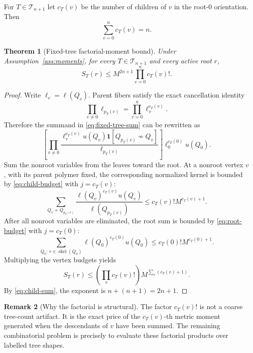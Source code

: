 \documentclass[11pt,a4paper]{article}
\newtheorem{theorem}{Theorem}[section]
\theoremstyle{definition}
\newtheorem{remark}[theorem]{Remark}
\newcommand{\skel}{\operatorname{skel}}
\newcommand{\Tree}{\mathcal T}
\newcommand{\ind}{\mathbf 1}
\begin{document}
For $T\in\Tree_{n+1}$ let $c_T(v)$ be the number of children of $v$ in the root-$0$
orientation.  Then
\begin{equation}
  \sum_{v=0}^{n}c_T(v)=n.
  \label{eq:child-sum}
\end{equation}

\begin{theorem}[Fixed-tree factorial-moment bound]
\label{thm:fixed-tree}
Under Assumption~\ref{ass:moments}, for every $T\in\Tree_{n+1}$ and every active root
$r$,
\begin{equation}
  S_T(r)\le M^{2n+1}\prod_{v=0}^{n}c_T(v)!.
  \label{eq:fixed-tree-bound}
\end{equation}
\end{theorem}

\begin{proof}
Write $\ell_v=\ell(Q_v)$.  Parent fibers satisfy the exact cancellation identity
\begin{equation}
 \prod_{v\ne0}\ell_{p_T(v)}
 =\prod_{v=0}^{n}\ell_v^{c_T(v)}.
 \label{eq:metric-cancellation}
\end{equation}
Therefore the summand in \eqref{eq:fixed-tree-sum} can be rewritten as
\begin{equation}
 \left[
  \prod_{v\ne0}
   \frac{\ell_v^{c_T(v)}u(Q_v)
         \ind[Q_{p_T(v)}\not\sim Q_v]}
        {\ell_{p_T(v)}}
 \right]
 \ell_0^{c_T(0)}u(Q_0).
 \label{eq:normalized-product}
\end{equation}
Sum the nonroot variables from the leaves toward the root.  At a nonroot vertex $v$,
with its parent polymer fixed, the corresponding normalized kernel is bounded by
\eqref{eq:child-budget} with $j=c_T(v)$:
\[
  \sum_{Q_v\not\sim Q_{p_T(v)}}
    \frac{\ell(Q_v)^{c_T(v)}u(Q_v)}{\ell(Q_{p_T(v)})}
  \le c_T(v)!M^{c_T(v)+1}.
\]
After all nonroot variables are eliminated, the root sum is bounded by
\eqref{eq:root-budget} with $j=c_T(0)$:
\[
  \sum_{Q_0:\,r\in\skel(Q_0)}
     \ell(Q_0)^{c_T(0)}u(Q_0)
  \le c_T(0)!M^{c_T(0)+1}.
\]
Multiplying the vertex budgets yields
\[
  S_T(r)
  \le \left(\prod_v c_T(v)!\right)
       M^{\sum_v(c_T(v)+1)}.
\]
By \eqref{eq:child-sum}, the exponent is $n+(n+1)=2n+1$.
\end{proof}

\begin{remark}[Why the factorial is structural]
The factor $c_T(v)!$ is not a coarse tree-count artifact.  It is the exact price of the
$c_T(v)$-th metric moment generated when the descendants of $v$ have been summed.  The
remaining combinatorial problem is precisely to evaluate these factorial products over
labelled tree shapes.
\end{remark}
\end{document}
